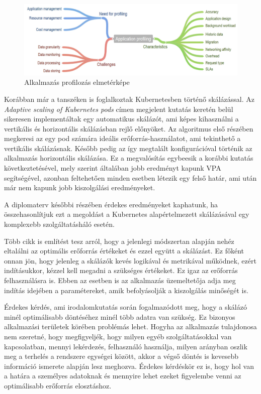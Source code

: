 \begin{figure}[!ht]
\centering
\includegraphics[width=150mm, keepaspectratio]{figures/applicationprofiling.png}
\caption{Alkalmazás profilozás elmetérképe\citep{CloudResourceManagement}}
\label{fig:applicationprofiling}
\end{figure}

Korábban már a tanszéken is foglalkoztak Kubernetesben történő skálázással. Az \emph{Adaptive scaling of Kubernetes pods}\cite{AdaptiveScalingOfPods} címen megjelent kutatás keretén belül sikeresen implementáltak egy automatikus skálázót, ami képes kihasználni a vertikális és horizontális skálázásban rejlő előnyöket. Az algoritmus első részében megkeresi az egy pod számára ideális erőforrás-használatot, ami tekinthető a vertikális skálázásnak. Később pedig az így megtalált konfigurációval történik az alkalmazás horizontális skálázása. Ez a megvalósítás egybeesik a korábbi kutatás következtetésével\citep{bscThesis}, mely szerint általában jobb eredményt kapunk VPA segítségével, azonban feltehetően minden esetben létezik egy felső határ, ami után már nem kapunk jobb kiszolgálási eredményeket. 

A diplomaterv későbbi részében érdekes eredményeket kaphatunk, ha összehasonlítjuk ezt a megoldást a Kubernetes alapértelmezett skálázásával egy komplexebb szolgáltatásháló esetén.

Több cikk\cite{AdaptiveScalingOfPods}\citep{PredictingUsageAndProactiveScaling} is említést tesz
arról, hogy a jelenlegi módszertan alapján nehéz eltalálni az optimális erőforrás értékeket és ezzel
együtt a skálázást. Ez főként onnan jön, hogy jelenleg a skálázók kevés logikával és metrikával
működnek, ezért indításukkor, kézzel kell megadni a szükséges értékeket. Ez igaz az erőforrás
felhasználásra is. Ebben az esetben is az alkalmazás üzemeltetőja adja meg indítás idejében a
paramétereket, amik befolyásolják a kiszolgálás minőségét is. 

Érdekes kérdés, ami irodalomkutatás során fogalmazódott meg, hogy a skálázó minél optimálisabb döntéséhez minél több adatra van szükség. Ez bizonyos alkalmazási területek körében problémás lehet. Hogyha az alkalmazás tulajdonosa nem szeretné, hogy megfigyeljék, hogy milyen egyéb szolgáltatásokkal van kapcsolatban, mennyi lekérdezés, felhasználó használja, milyen arányban oszlik meg a terhelés a rendszere egységei között, akkor a végső döntés is kevesebb információ ismerete alapján lesz meghozva. Érdekes kérdéskör ez is, hogy hol van a határa a személyes adatoknak és mennyire lehet ezeket figyelembe venni az optimálisabb erőforrás elosztáshoz.

